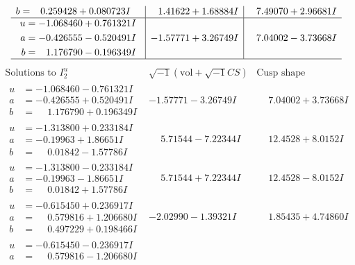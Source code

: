 \documentclass[1p]{elsarticle_modified}
\theoremstyle{definition}
\newcommand{\I}{\sqrt{-1}}
\begin{document}
$$\begin{array}{c|c|c}
\begin{aligned}
b &= \phantom{-}0.259428 + 0.080723 I\end{aligned}
 & \phantom{-}1.41622 + 1.68884 I & \phantom{-}7.49070 + 2.96681 I \\ \hline\begin{aligned}
u &= -1.068460 + 0.761321 I \\
a &= -0.426555 - 0.520491 I \\
b &= \phantom{-}1.176790 - 0.196349 I\end{aligned}
 & -1.57771 + 3.26749 I & \phantom{-}7.04002 - 3.73668 I\\
 \hline 
 \end{array}$$\newpage$$\begin{array}{c|c|c}  
\text{Solutions to }I^u_{2}& \I (\text{vol} + \sqrt{-1}CS) & \text{Cusp shape}\\
 \hline 
\begin{aligned}
u &= -1.068460 - 0.761321 I \\
a &= -0.426555 + 0.520491 I \\
b &= \phantom{-}1.176790 + 0.196349 I\end{aligned}
 & -1.57771 - 3.26749 I & \phantom{-}7.04002 + 3.73668 I \\ \hline\begin{aligned}
u &= -1.313800 + 0.233184 I \\
a &= -0.19963 + 1.86651 I \\
b &= \phantom{-}0.01842 - 1.57786 I\end{aligned}
 & \phantom{-}5.71544 - 7.22344 I & \phantom{-}12.4528 + 8.0152 I \\ \hline\begin{aligned}
u &= -1.313800 - 0.233184 I \\
a &= -0.19963 - 1.86651 I \\
b &= \phantom{-}0.01842 + 1.57786 I\end{aligned}
 & \phantom{-}5.71544 + 7.22344 I & \phantom{-}12.4528 - 8.0152 I \\ \hline\begin{aligned}
u &= -0.615450 + 0.236917 I \\
a &= \phantom{-}0.579816 + 1.206680 I \\
b &= \phantom{-}0.497229 + 0.198466 I\end{aligned}
 & -2.02990 - 1.39321 I & \phantom{-}1.85435 + 4.74860 I \\ \hline\begin{aligned}
u &= -0.615450 - 0.236917 I \\
a &= \phantom{-}0.579816 - 1.206680 I \\

\end{aligned}
\end{array}$$
\end{document}
